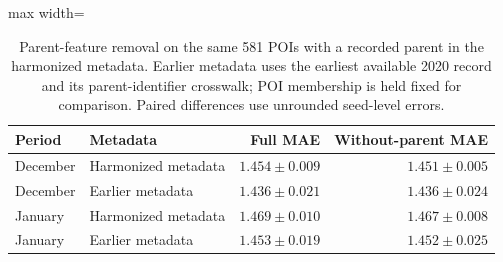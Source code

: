 \begin{table}[!htbp]
\centering
\begingroup
\singlespacing
\fontsize{9pt}{10.5pt}\selectfont
\setlength{\tabcolsep}{4pt}
\renewcommand{\arraystretch}{1.08}
\caption{Parent-feature removal on the same 581 POIs with a recorded parent in the harmonized metadata. Earlier metadata uses the earliest available 2020 record and its parent-identifier crosswalk; POI membership is held fixed for comparison. Paired differences use unrounded seed-level errors.}
\label{tab:parent_ablation}
\begin{adjustbox}{max width=\linewidth}
\begin{tabular}{llrr}
\toprule
Period & Metadata & Full MAE & Without-parent MAE \\
\midrule
December & Harmonized metadata & $1.454\pm 0.009$ & $1.451\pm 0.005$ \\
December & Earlier metadata & $1.436\pm 0.021$ & $1.436\pm 0.024$ \\
January & Harmonized metadata & $1.469\pm 0.010$ & $1.467\pm 0.008$ \\
January & Earlier metadata & $1.453\pm 0.019$ & $1.452\pm 0.025$ \\
\bottomrule
\end{tabular}
\end{adjustbox}
\endgroup
\end{table}
